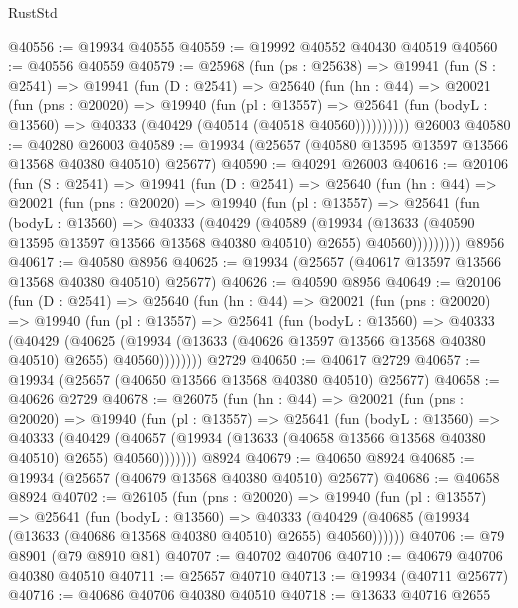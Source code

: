 \begin{lexlean}{RustStd}
\begin{coremodule}
@40556 := @19934 @40555
@40559 := @19992 @40552 @40430 @40519
@40560 := @40556 @40559
@40579 := @25968
    (fun (ps : @25638) =>
    @19941
      (fun (S : @2541) =>
      @19941
        (fun (D : @2541) =>
        @25640
          (fun (hn : @44) =>
          @20021
            (fun (pns : @20020) =>
            @19940
              (fun (pl : @13557) =>
              @25641 (fun (bodyL : @13560) => @40333 (@40429 (@40514 (@40518 @40560))))))))))
    @26003
@40580 := @40280 @26003
@40589 := @19934 (@25657 (@40580 @13595 @13597 @13566 @13568 @40380 @40510) @25677)
@40590 := @40291 @26003
@40616 := @20106
    (fun (S : @2541) =>
    @19941
      (fun (D : @2541) =>
      @25640
        (fun (hn : @44) =>
        @20021
          (fun (pns : @20020) =>
          @19940
            (fun (pl : @13557) =>
            @25641
              (fun (bodyL : @13560) =>
              @40333
                (@40429
                  (@40589
                    (@19934
                      (@13633 (@40590 @13595 @13597 @13566 @13568 @40380 @40510) @2655)
                      @40560)))))))))
    @8956
@40617 := @40580 @8956
@40625 := @19934 (@25657 (@40617 @13597 @13566 @13568 @40380 @40510) @25677)
@40626 := @40590 @8956
@40649 := @20106
    (fun (D : @2541) =>
    @25640
      (fun (hn : @44) =>
      @20021
        (fun (pns : @20020) =>
        @19940
          (fun (pl : @13557) =>
          @25641
            (fun (bodyL : @13560) =>
            @40333
              (@40429
                (@40625
                  (@19934 (@13633 (@40626 @13597 @13566 @13568 @40380 @40510) @2655) @40560))))))))
    @2729
@40650 := @40617 @2729
@40657 := @19934 (@25657 (@40650 @13566 @13568 @40380 @40510) @25677)
@40658 := @40626 @2729
@40678 := @26075
    (fun (hn : @44) =>
    @20021
      (fun (pns : @20020) =>
      @19940
        (fun (pl : @13557) =>
        @25641
          (fun (bodyL : @13560) =>
          @40333
            (@40429
              (@40657 (@19934 (@13633 (@40658 @13566 @13568 @40380 @40510) @2655) @40560)))))))
    @8924
@40679 := @40650 @8924
@40685 := @19934 (@25657 (@40679 @13568 @40380 @40510) @25677)
@40686 := @40658 @8924
@40702 := @26105
    (fun (pns : @20020) =>
    @19940
      (fun (pl : @13557) =>
      @25641
        (fun (bodyL : @13560) =>
        @40333 (@40429 (@40685 (@19934 (@13633 (@40686 @13568 @40380 @40510) @2655) @40560))))))
@40706 := @79 @8901 (@79 @8910 @81)
@40707 := @40702 @40706
@40710 := @40679 @40706 @40380 @40510
@40711 := @25657 @40710
@40713 := @19934 (@40711 @25677)
@40716 := @40686 @40706 @40380 @40510
@40718 := @13633 @40716 @2655

\end{coremodule}
\end{lexlean}
